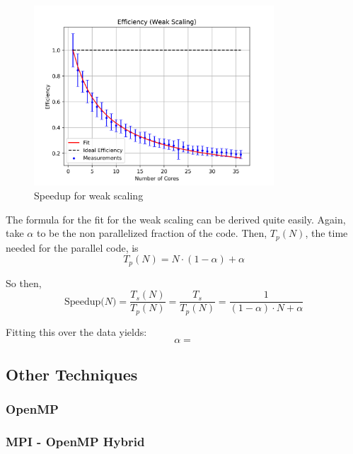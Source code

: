 \documentclass[12pt, a4paper, titlepage]{article}
\newcommand{\vp}{\vspace{1cm}}
\begin{document}
{\begin{figure}[h!]
\begin{center}
\includegraphics[width=0.8\textwidth]{pictures/speedup_weak.png}
\end{center}
\caption{Speedup for weak scaling}
\end{figure}
The formula for the fit for the weak scaling can be derived quite easily. Again, take $\alpha$ to be the non parallelized fraction of the code. Then, $T_p(N)$, the time needed for the parallel code, is\\
\begin{equation*}
T_p(N) = N \cdot (1 - \alpha) + \alpha
\end{equation*} 

So then, 
\begin{equation*}
\text{Speedup($N$)} = \frac{T_s(N)}{T_p(N)} = \frac{T_s}{T_p(N)} = \frac{1}{(1-\alpha)\cdot N + \alpha}
\end{equation*} 

Fitting this over the data yields:
\begin{equation}
\alpha = 
\end{equation}

\vp
\subsection{Other Techniques}

\subsubsection{OpenMP}


\subsubsection{MPI - OpenMP Hybrid}



}
\end{document}

